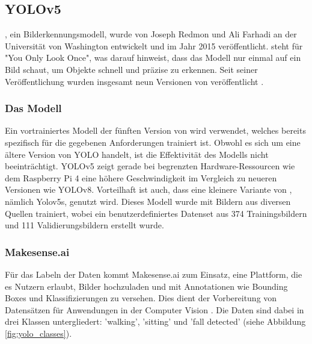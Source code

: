 \subsection{YOLOv5}
, ein Bilderkennungsmodell, wurde von Joseph Redmon und Ali Farhadi an der Universität von Washington entwickelt und im Jahr 2015 veröffentlicht.  steht für "You Only Look Once", was darauf hinweist, dass das Modell nur einmal auf ein Bild schaut, um Objekte schnell und präzise zu erkennen. Seit seiner Veröffentlichung wurden insgesamt neun Versionen von  veröffentlicht \cite{Yolo} .

\subsubsection{Das Modell}
Ein vortrainiertes Modell der fünften Version von  wird verwendet, welches bereits spezifisch für die gegebenen Anforderungen trainiert ist. Obwohl es sich um eine ältere Version von YOLO handelt, ist die Effektivität des Modells nicht beeinträchtigt. YOLOv5 zeigt gerade bei begrenzten Hardware-Ressourcen wie dem Raspberry Pi 4 eine höhere Geschwindigkeit im Vergleich zu neueren Versionen wie YOLOv8. Vorteilhaft ist auch, dass eine kleinere Variante von , nämlich Yolov5s, genutzt wird. Dieses Modell wurde mit Bildern aus diversen Quellen trainiert, wobei ein benutzerdefiniertes Datenset aus 374 Trainingsbildern und 111 Validierungsbildern erstellt wurde.

\subsubsection{Makesense.ai}
Für das Labeln der Daten kommt Makesense.ai zum Einsatz, eine Plattform, die es Nutzern erlaubt, Bilder hochzuladen und mit Annotationen wie Bounding Boxes und Klassifizierungen zu versehen. Dies dient der Vorbereitung von Datensätzen für Anwendungen in der Computer Vision \cite{noauthor_make_nodate}. Die Daten sind dabei in drei Klassen untergliedert: 'walking', 'sitting' und 'fall detected' (siehe Abbildung \ref{fig:yolo_classes}).


